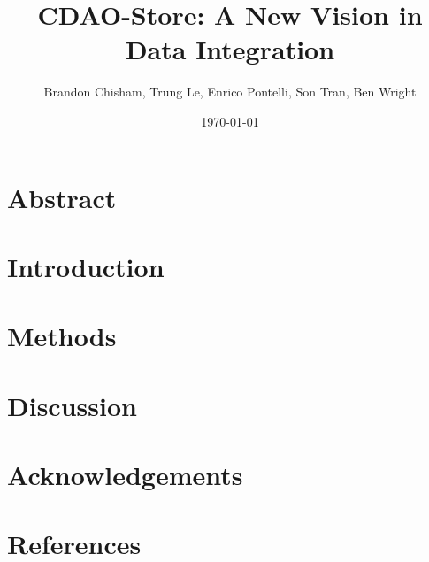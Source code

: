 \documentclass[12pt]{article}
\author{Brandon Chisham, Trung Le, Enrico Pontelli, Son Tran, Ben Wright}
\title{CDAO-Store: A New Vision in Data Integration}
\date{\today}
\begin{document}
\maketitle
\newpage
\tableofcontents

\newpage
\section{Abstract}

\newpage
\section{Introduction}

\newpage
\section{Methods}

\newpage
\section{Discussion}

\newpage
\section{Acknowledgements}

\newpage
\section{References}

\end{document}
